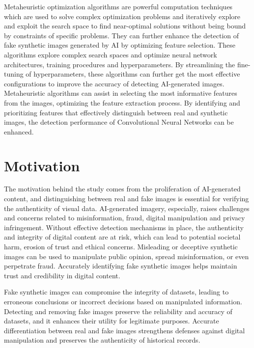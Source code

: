 Metaheuristic optimization algorithms are powerful computation techniques which are used to solve complex optimization problems and iteratively explore and exploit the search space to find near-optimal solutions without being bound by constraints of specific problems. They can further enhance the detection of fake synthetic images generated by AI by optimizing feature selection. These algorithms explore complex search spaces and optimize neural network architectures, training procedures and hyperparameters. By streamlining the fine-tuning of hyperparameters, these algorithms can further get the most effective configurations to improve the accuracy of detecting AI-generated images. Metaheuristic algorithms can assist in selecting the most informative features from the images, optimizing the feature extraction process. By identifying and prioritizing features that effectively distinguish between real and synthetic images, the detection performance of Convolutional Neural Networks can be enhanced. 



\section{Motivation}

The motivation behind the study comes from the proliferation of AI-generated content, and distinguishing between real and fake images is essential for verifying the authenticity of visual data. AI-generated imagery, especially, raises challenges and concerns related to misinformation, fraud, digital manipulation and privacy infringement. Without effective detection mechanisms in place, the authenticity and integrity of digital content are at risk, which can lead to potential societal harm, erosion of trust and ethical concerns. Misleading or deceptive synthetic images can be used to manipulate public opinion, spread misinformation, or even perpetrate fraud. Accurately identifying fake synthetic images helps maintain trust and credibility in digital content.

Fake synthetic images can compromise the integrity of datasets, leading to erroneous conclusions or incorrect decisions based on manipulated information. Detecting and removing fake images preserve the reliability and accuracy of datasets, and it enhances their utility for legitimate purposes. Accurate differentiation between real and fake images strengthens defenses against digital manipulation and preserves the authenticity of historical records.


